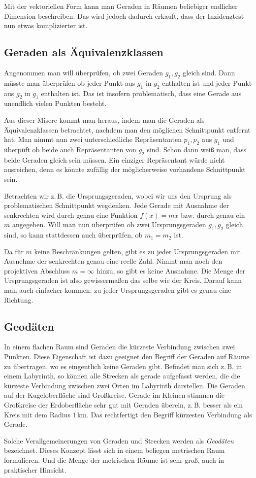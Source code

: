 \documentclass[a4paper,11pt,fleqn,twocolumn,twoside]{article}
\begin{document}
Mit der vektoriellen Form kann man Geraden in Räumen beliebiger
endlicher Dimension beschreiben. Das wird jedoch dadurch erkauft,
dass der Inzidenztest nun etwas komplizierter ist.

\subsection{Geraden als Äquivalenzklassen}

Angenommen man will überprüfen, ob zwei Geraden $g_1,g_2$ gleich sind.
Dann müsste man überprüfen ob jeder Punkt aus $g_1$ in $g_2$
enthalten ist und jeder Punkt aus $g_2$ in $g_1$ enthalten ist.
Das ist insofern problematisch, dass eine Gerade aus unendlich vielen
Punkten besteht.

Aus dieser Misere kommt man heraus, indem man die Geraden als
Äquivalenzklassen betrachtet, nachdem man den möglichen Schnittpunkt
entfernt hat. Man nimmt nun zwei unterschiedliche Repräsentanten
$p_1,p_2$ aus $g_1$ und überpüft ob beide auch Repräsentanten
von $g_2$ sind. Schon dann weiß man, dass beide Geraden gleich sein müssen.
Ein einziger Repräsentant würde nicht ausreichen, denn es könnte
zufällig der möglicherweise vorhandene Schnittpunkt sein.

Betrachten wir z.\,B. die Ursprungsgeraden, wobei wir uns den
Ursprung als problematischen Schnittpunkt wegdenken. Jede Gerade
mit Ausnahme der senkrechten wird durch genau eine Funktion
$f(x)=mx$ bzw. durch genau ein $m$ angegeben.
Will man nun überprüfen ob zwei Ursprungsgeraden $g_1,g_2$ gleich
sind, so kann stattdessen auch überprüfen, ob $m_1=m_2$ ist.

Da für $m$ keine Beschränkungen gelten, gibt es zu jeder
Ursprungsgeraden mit Ausnehme der senkrechten genau eine reelle Zahl.
Nimmt man noch den projektiven Abschluss $m=\infty$ hinzu, so
gibt es keine Ausnahme. Die Menge der Ursprungsgeraden ist also
gewissermaßen das selbe wie der Kreis. Darauf kann man auch einfacher
kommen: zu jeder Ursprungsgeraden gibt es genau eine Richtung.


\subsection{Geodäten}

In einem flachen Raum sind Geraden die kürzeste Verbindung zwischen
zwei Punkten. Diese Eigenschaft ist dazu geeignet den Begriff der
Geraden auf Räume zu übertragen, wo es eingentlich keine Geraden
gibt. Befindet man sich z.\,B. in einem Labyrinth, so können alle
Strecken als gerade aufgefasst werden, die die kürzeste Verbindung
zwischen zwei Orten im Labyrinth darstellen. Die Geraden auf der
Kugeloberfläche sind Großkreise.
Gerade im Kleinen stimmen die Großkreise der Erdoberfläche sehr gut mit
Geraden überein, z.\,B. besser als ein Kreis mit dem Radius $1\,\mathrm{km}$.
Das rechtfertigt den Begriff kürzesten Verbindung als Gerade.

Solche Verallgemeinerungen von Geraden und Strecken werden als
\textit{Geodäten} bezeichnet. Dieses Konzept lässt sich in einem
beliegen metrischen Raum formulieren. Und die Menge der metrischen
Räume ist sehr groß, auch in praktischer Hinsicht.
\end{document}
